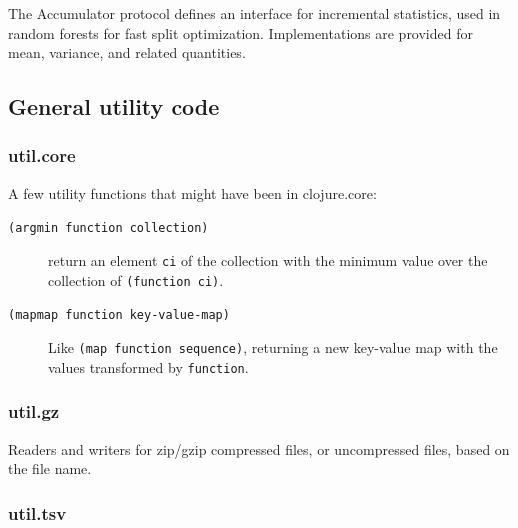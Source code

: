 \documentclass[11pt,openany,american,usenames,dvipsnames,svgnames,x11names,table,isodate]{article}
\numberwithin{equation}{section}
\numberwithin{figure}{section}
\begin{document}
The Accumulator protocol defines an interface for incremental statistics,
used in random forests for fast split optimization. Implementations
are provided for mean, variance, and related quantities.


\subsection{General utility code}


\subsubsection{util.core}

A few utility functions that might have been in clojure.core:
\begin{description}
\item [{\texttt{(argmin~function~collection)}}] return an element \texttt{ci}
of the collection with the minimum value over the collection of \texttt{(function~ci)}.
\item [{\texttt{(mapmap~function~key-value-map)}}] Like \texttt{(map~function~sequence)},
returning a new key-value map with the values transformed by \texttt{function}. 
\end{description}

\subsubsection{util.gz}

Readers and writers for zip/gzip compressed files, or uncompressed
files, based on the file name.


\subsubsection{\label{sub:util.tsv}util.tsv}
\end{document}
